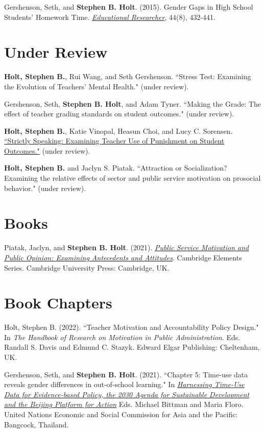 \documentclass[margin,line]{res}
\begin{document}
\begin{resume}
Gershenson, Seth, and \textbf{Stephen B. Holt}. (2015). Gender Gaps in High School Students’ Homework Time. \href{http://journals.sagepub.com/doi/full/10.3102/0013189X15616123}{\textit{Educational Researcher}}, 44(8), 432-441.

\section{\sc Under Review}
\textbf{Holt, Stephen B.}, Rui Wang, and Seth Gershenson. ``Stress Test: Examining the Evolution of Teachers' Mental Health." (under review).

Gershenson, Seth, \textbf{Stephen B. Holt}, and Adam Tyner. ``Making the Grade: The effect of teacher grading standards on student outcomes." (under review).

\textbf{Holt, Stephen B.}, Katie Vinopal, Heasun Choi, and Lucy C. Sorensen. \href{https://doi.org/10.26300/meqn-w550}{``Strictly Speaking: Examining Teacher Use of Punishment on Student Outcomes."} (under review).

\textbf{Holt, Stephen B.} and Jaclyn S. Piatak. ``Attraction or Socialization? Examining the relative effects of sector and public service motivation on prosocial behavior." (under review).

\section{\sc Books}
Piatak, Jaclyn, and \textbf{Stephen B. Holt}. (2021). \href{https://doi.org/10.1017/9781108966672}{\textit{Public Service Motivation and Public Opinion: Examining Antecedents and Attitudes}}. Cambridge Elements Series. Cambridge University Press: Cambridge, UK.

\section{\sc Book Chapters}
Holt, Stephen B. (2022). ``Teacher Motivation and Accountability Policy Design." In \textit{The Handbook of Research on Motivation in Public Administration}. Eds. Randall S. Davis and Edmund C. Stazyk. Edward Elgar Publishing: Cheltenham, UK.

Gershenson, Seth, and \textbf{Stephen B. Holt}. (2021). ``Chapter 5: Time-use data reveals gender differences in out-of-school learning." In \href{https://www.unescap.org/kp/2021/harnessing-time-use-data-evidence-based-policy-2030-agenda-sustainable-development-and}{\textit{Harnessing Time-Use Data for Evidence-based Policy, the 2030 Agenda for Sustainable Development and the Beijing Platform for Action}} Eds. Michael Bittman and Maria Floro. United Nations Economic and Social Commission for Asia and the Pacific: Bangcock, Thailand.


\end{resume}
\end{document}
